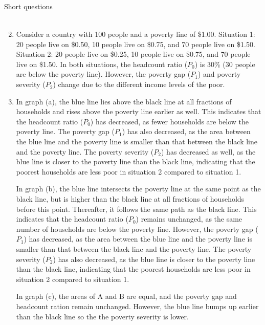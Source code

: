 \begin{homeworkProblem}{Short questions}
\begin{solution}
\begin{enumerate}
\[\begin{aligned}
                    \end{aligned}
                \]
            \item Consider a country with 100 people and a poverty line of 
                \$1.00. Situation 1: 20 people live on \$0.50, 10 people live 
                on \$0.75, and 70 people live on \$1.50. Situation 2: 20 people 
                live on \$0.25, 10 people live on \$0.75, and 70 people live on 
                \$1.50. In both situations, the headcount ratio ($P_0$) is 30\% 
                (30 people are below the poverty line). However, the poverty 
                gap ($P_1$) and poverty severity ($P_2$) change due to the 
                different income levels of the poor.
            \item In graph (a), the blue line lies above the black line at all
                fractions of households and rises above the poverty line earlier
                as well. This indicates that the headcount ratio ($P_0$) has
                decreased, as fewer households are below the poverty line. The
                poverty gap ($P_1$) has also decreased, as the area between the
                blue line and the poverty line is smaller than that between the
                black line and the poverty line. The poverty severity ($P_2$)
                has decreased as well, as the blue line is closer to the poverty
                line than the black line, indicating that the poorest households
                are less poor in situation 2 compared to situation 1.

                In graph (b), the blue line intersects the poverty line at the
                same point as the black line, but is higher than the black line
                at all fractions of households before this point. Thereafter, it
                follows the same path as the black line. This indicates that the
                headcount ratio ($P_0$) remains unchanged, as the same number of
                households are below the poverty line. However, the poverty gap
                ($P_1$) has decreased, as the area between the blue line and the
                poverty line is smaller than that between the black line and the
                poverty line. The poverty severity ($P_2$) has also decreased,
                as the blue line is closer to the poverty line than the black
                line, indicating that the poorest households are less poor in
                situation 2 compared to situation 1.

                In graph (c), the areas of A and B are equal, and the poverty
                gap and headcount ration remain unchanged. However, the blue
                line bumps up earlier than the black line so the the poverty
                severity is lower. 
        \end{enumerate}

    \end{solution}

\end{homeworkProblem}